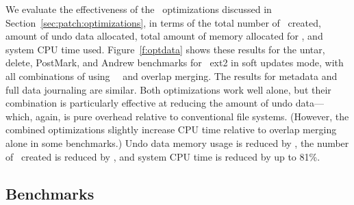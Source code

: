 \opttable{}

We evaluate the effectiveness of the \patch\ optimizations discussed in
Section~\ref{sec:patch:optimizations}, in terms of
%
the total number of \patches\ created, amount of undo data allocated,
total amount of memory allocated for \Kudos, and system CPU time used.
%
Figure~\ref{f:optdata} shows these results for the untar, delete,
PostMark, and Andrew benchmarks for \Kudos\ ext2 in soft updates mode,
with all combinations of using \nrb\ \patches\ and overlap merging.
The results for metadata and full data journaling are similar.
%
Both optimizations work well alone, but their combination is particularly
effective at reducing the amount of undo data---which, again, is pure
overhead relative to conventional file systems.  (However, the combined
optimizations slightly increase CPU time relative to overlap merging alone
in some benchmarks.)
%
Undo data memory usage is reduced by \patchoptundo,
%
the number of \patches\ created is reduced by \patchoptcount,
%
and system CPU time is reduced by up to 81\%.

\begin{comment}
\begin{figure}[t]
\vspace{-0.5\baselineskip}
\centering{
\texttt{[image: rb\_patch\_size]}
}
\vspace{-0.5\baselineskip}
\caption{\label{fig:patchsize-histo} \Rb\ \patch\ size histogram for a sample
workload (extracting a large archive into ext2). All the \patches\ larger than
63 bytes have been optimized into \nrb\ \patches. \Rb\ \patches\ 4 bytes and
smaller account for about 51\% of all \rb\ \patches.}
\end{figure}
\end{comment}

\subsection {Benchmarks}
\label{sec:eval:bench}

\newcommand{\safe}[1]{\textbf{#1}}
\newcommand{\unsafe}[1]{#1}

